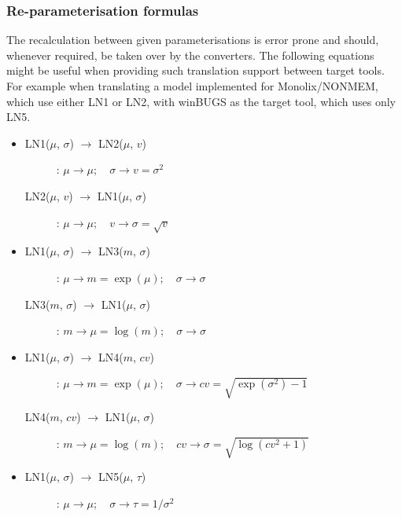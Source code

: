 \subsubsection{Re-parameterisation formulas}
\label{subsubsec:formulas}
The recalculation between given parameterisations is error prone 
and should, whenever required, be taken over by the converters. The 
following equations might be useful when providing such translation support 
between target tools. For example when translating a model implemented 
for Monolix/NONMEM, which use either LN1 or LN2, with winBUGS as the 
target tool, which uses only LN5.\\
\begin{itemize}
\item 
\begin{description}
\item[LN1($\mu$, $\sigma$) $\rightarrow$ LN2($\mu$, $v$)]:
$\mu \rightarrow \mu; \quad \sigma \rightarrow v=\sigma^2$

\item[LN2($\mu$, $v$) $\rightarrow$ LN1($\mu$, $\sigma$)]:
$\mu \rightarrow \mu; \quad v \rightarrow \sigma = \sqrt{v}$
\end{description}

\item 
\begin{description}
\item[LN1($\mu$, $\sigma$) $\rightarrow$ LN3($m$, $\sigma$)]:
$\mu \rightarrow m=\exp(\mu); \quad \sigma \rightarrow \sigma$

\item[LN3($m$, $\sigma$) $\rightarrow$ LN1($\mu$, $\sigma$)]:
$m \rightarrow \mu=\log(m); \quad \sigma \rightarrow \sigma$
\end{description}

\item 
\begin{description}
\item[LN1($\mu$, $\sigma$) $\rightarrow$ LN4($m$, $cv$)]:
$\mu \rightarrow m=\exp(\mu); \quad \sigma \rightarrow cv=\sqrt{\exp(\sigma^2)-1}$

\item[LN4($m$, $cv$) $\rightarrow$ LN1($\mu$, $\sigma$)]:
$m \rightarrow \mu=\log(m); \quad cv \rightarrow \sigma=\sqrt{\log(cv^2 + 1)}$
\end{description}

\item 
\begin{description}
\item[LN1($\mu$, $\sigma$) $\rightarrow$ LN5($\mu$, $\tau$)]:
$\mu \rightarrow \mu; \quad \sigma \rightarrow \tau=1/\sigma^2$


\end{description}
\end{itemize}
